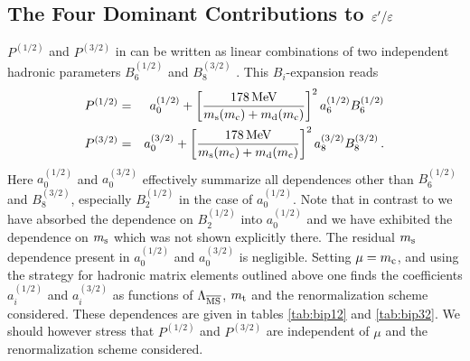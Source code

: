 \subsection{The Four Dominant Contributions to $\varepsilon'/\varepsilon$}
           \label{subsec:epe4dom}
$P^{(1/2)}$ and $P^{(3/2)}$ in  can be written as linear
combinations of two independent hadronic parameters $B_6^{(1/2)}$ and
$B_8^{(3/2)}$ \cite{burasetal:92d}. This $B_i$-expansion reads
\begin{eqnarray}
P^{(1/2)} &=& a_0^{(1/2)} +
  \left[ \frac{178\, {\rm MeV}}{m_{\rm s}(m_{\rm c})+m_{\rm d}(m_{\rm c})} \right]^2 a_6^{(1/2)} B_6^{(1/2)}
\label{eq:P12Bi} \\
P^{(3/2)} &=& a_0^{(3/2)} +
  \left[ \frac{178\, {\rm MeV}}{m_{\rm s}(m_{\rm c})+m_{\rm d}(m_{\rm c})} \right]^2 a_8^{(3/2)} B_8^{(3/2)}
  \, .
\label{eq:P32Bi}
\end{eqnarray}
Here $a_0^{(1/2)}$ and $a_0^{(3/2)}$ effectively summarize all
dependences other than $B_6^{(1/2)}$ and $B_8^{(3/2)}$, especially
$B_2^{(1/2)}$ in the case of $a_0^{(1/2)}$.
Note that in contrast to \cite{burasetal:92d} we have absorbed the
dependence on $B_2^{(1/2)}$ into $a_0^{(1/2)}$ and we have exhibited the
dependence on $m_{\rm s}$ which was not shown explicitly there.
The residual $m_{\rm s}$ dependence present in $a_0^{(1/2)}$ and
$a_0^{(3/2)}$ is negligible.  Setting $\mu=m_{\rm c}$, and using the strategy
for hadronic matrix elements outlined above one finds the coefficients
$a_i^{(1/2)}$ and $a_i^{(3/2)}$ as functions of $\Lambda_{\overline{\rm MS}}$, $m_{\rm t}$ and the
renormalization scheme considered. These dependences are given in
tables \ref{tab:bip12} and \ref{tab:bip32}. We should however stress
that $P^{(1/2)}$ and $P^{(3/2)}$ are independent of $\mu$ and the
renormalization scheme considered.

